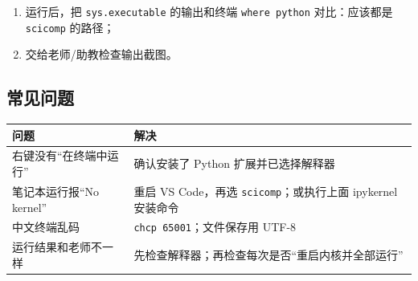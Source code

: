 \begin{Shaded}
\begin{Highlighting}[]
\OperatorTok{=}\NormalTok{ [}\NormalTok{, }\NormalTok{, }\NormalTok{, }\NormalTok{, }\NormalTok{]}
\NormalTok{(}\NormalTok{, }\OperatorTok{/} 
\end{Highlighting}
\end{Shaded}

\begin{enumerate}
\def\labelenumi{\arabic{enumi}.}
\setcounter{enumi}{3}
\tightlist
\item
  运行后，把 \texttt{sys.executable} 的输出和终端 \texttt{where\ python}
  对比：应该都是 \texttt{scicomp} 的路径；
\item
  交给老师/助教检查输出截图。
\end{enumerate}

\subsection{常见问题}\label{ux5e38ux89c1ux95eeux9898-1}

{\def\LTcaptype{none} %
\begin{longtable}[]{@{}
  >{\raggedright\arraybackslash}p{}
  >{\raggedright\arraybackslash}p{}@{}}
\toprule\noalign{}
\begin{minipage}[b]{\linewidth}\raggedright
问题
\end{minipage} & \begin{minipage}[b]{\linewidth}\raggedright
解决
\end{minipage} \\
\midrule\noalign{}
\endhead
\bottomrule\noalign{}
\endlastfoot
右键没有``在终端中运行'' & 确认安装了 Python 扩展并已选择解释器 \\
笔记本运行报``No kernel'' & 重启 VS Code，再选
\texttt{scicomp}；或执行上面 ipykernel 安装命令 \\
中文终端乱码 & \texttt{chcp\ 65001}；文件保存用 UTF-8 \\
运行结果和老师不一样 &
先检查解释器；再检查每次是否``重启内核并全部运行'' \\
\end{longtable}
}

